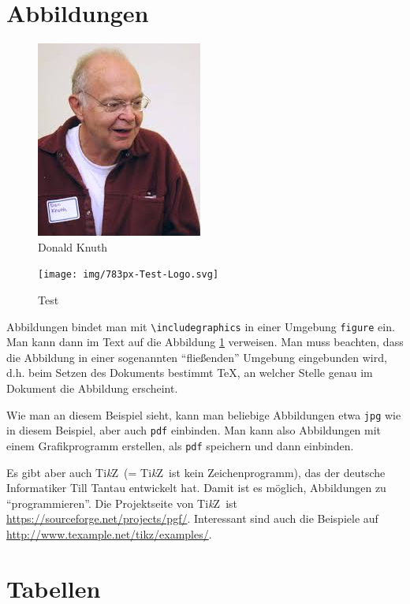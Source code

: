 \section{Abbildungen}

\begin{figure}[!htb]
	\centering
	\includegraphics[width=.4\textwidth]{img/knuth.jpg}
	\caption{Donald Knuth}
	\label{fig:knuth}
\end{figure}


\begin{figure}[!htb]
	\centering
	\texttt{[image: img/783px-Test-Logo.svg]}
	\caption{Test}
	\label{fig:test}
\end{figure}

Abbildungen bindet man mit \verb=\includegraphics= in einer Umgebung
\verb=figure= ein.
Man kann dann im Text auf die Abbildung \ref{fig:knuth} verweisen.
Man muss beachten, dass die Abbildung in einer sogenannten
\enquote{fließenden} Umgebung eingebunden wird, d.h. beim Setzen des
Dokuments bestimmt \TeX, an welcher Stelle genau im Dokument die
Abbildung erscheint.

Wie man an diesem Beispiel sieht, kann man beliebige Abbildungen etwa
\verb=jpg= wie in diesem Beispiel, aber auch \verb=pdf= einbinden. Man
kann also Abbildungen mit einem Grafikprogramm erstellen, als
\verb=pdf= speichern und dann einbinden.

\newcommand{\tikz}{Ti\emph{k}Z}

Es gibt aber auch \tikz\ (= \tikz\ ist kein Zeichenprogramm), das der
deutsche Informatiker Till Tantau entwickelt hat. Damit ist es möglich,
Abbildungen zu \enquote{programmieren}. Die Projektseite von \tikz\ ist
\url{https://sourceforge.net/projects/pgf/}. Interessant sind auch
die Beispiele auf \url{http://www.texample.net/tikz/examples/}.

\section{Tabellen}

